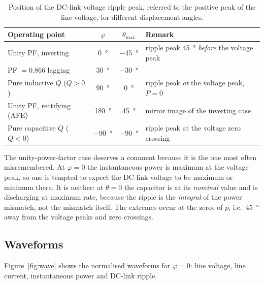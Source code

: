\documentclass[11pt,a4paper]{article}
\begin{document}
\begin{table}[htbp]
  \centering
  \caption{Position of the DC-link voltage ripple peak, referred to the positive
  peak of the line voltage, for different displacement angles.}
  \label{tab:cases}
  \begin{tabular}{lccl}
    \toprule
    Operating point & $\varphi$ & $\theta_{\max}$ & Remark \\
    \midrule
    Unity PF, inverting        & \SI{0}{\degree}   & \SI{-45}{\degree}
      & ripple peak \SI{45}{\degree} \emph{before} the voltage peak \\
    PF $=0.866$ lagging        & \SI{30}{\degree}  & \SI{-30}{\degree} & \\
    Pure inductive $Q$ ($Q>0$) & \SI{90}{\degree}  & \SI{0}{\degree}
      & ripple peak \emph{at} the voltage peak, $P=0$ \\
    Unity PF, rectifying (AFE) & \SI{180}{\degree} & \SI{+45}{\degree}
      & mirror image of the inverting case \\
    Pure capacitive $Q$ ($Q<0$)& \SI{-90}{\degree} & \SI{-90}{\degree}
      & ripple peak at the voltage zero crossing \\
    \bottomrule
  \end{tabular}
\end{table}

The unity-power-factor case deserves a comment because it is the one most often
misremembered. At $\varphi=0$ the instantaneous power is maximum at the voltage
peak, so one is tempted to expect the DC-link voltage to be maximum or minimum
there. It is neither: at $\theta = 0$ the capacitor is at its \emph{nominal}
value and is discharging at maximum rate, because the ripple is the
\emph{integral} of the power mismatch, not the mismatch itself. The extremes
occur at the zeros of $\tilde p$, i.e.\ \SI{45}{\degree} away from the voltage
peaks and zero crossings.

\subsection{Waveforms}

Figure~\ref{fig:wave} shows the normalised waveforms for $\varphi=0$: line
voltage, line current, instantaneous power and DC-link ripple.
\end{document}

